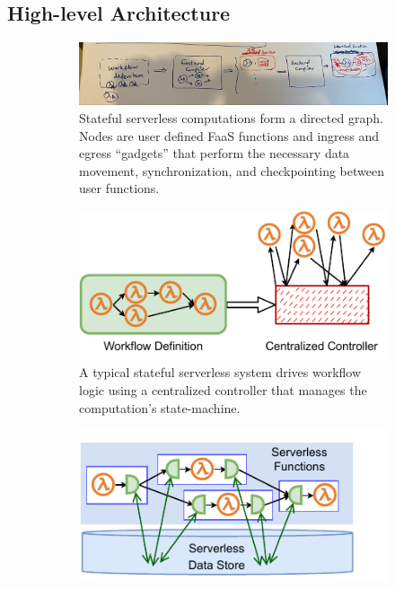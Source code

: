 \subsection{High-level Architecture}
\label{sec:architecture}

\begin{figure}[t]
	\centering
	\begin{subfigure}[t]{0.8\textwidth}
		\includegraphics[width=\columnwidth]{figures/architecture.png}
		\caption{Stateful serverless computations form a directed graph. Nodes
			are user defined FaaS functions and ingress and egress ``gadgets'' that perform the necessary data movement, synchronization, and checkpointing between user functions.}
		\label{fig:arch:unum-compile-time}
	\end{subfigure}
	\begin{subfigure}[b]{\columnwidth}
		\centering
		\includegraphics[width=0.8\columnwidth]{figures/unum-arch-centralized.pdf}
		\caption{A typical stateful serverless system drives workflow logic
			using a centralized controller that manages the computation's state-machine.}
		\label{fig:arch:centralized}
	\end{subfigure}
	\hfill
	\begin{subfigure}[b]{\columnwidth}
		\centering
		\includegraphics[width=.7\columnwidth]{figures/unum-arch-runtime.pdf}

\end{subfigure}
\end{figure}

